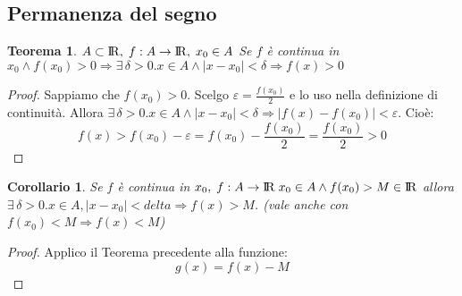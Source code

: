 \documentclass[12pt, a4paper]{article}
\theoremstyle{break}
\newtheorem{theorem}{Teorema}[subsection]
\newtheorem{corollary}{Corollario}[theorem]
\newcommand\R{{\rm I\!R}}
\begin{document}
    \subsection{Permanenza del segno}
    \begin{theorem}
        $A\subset\R,\; f:A\rightarrow\R ,\; x_0\in A$ Se $f$ è continua in $x_0 \wedge f(x_0)>0\Rightarrow\exists\,\delta >0. x\in A \wedge |x-x_0|<\delta\Rightarrow f(x)>0$
    \end{theorem}
    \begin{proof}
        Sappiamo che $f(x_0) > 0$. Scelgo $\varepsilon = \frac{f(x_0)}{2}$ e lo uso nella definizione di continuità.\newline
        Allora $\exists\,\delta>0. x\in A \wedge |x-x_0|<\delta \Rightarrow |f(x)-f(x_0)|<\varepsilon$. Cioè:\newline
        \[f(x)>f(x_0)-\varepsilon = f(x_0)-\frac{f(x_0)}{2} = \frac{f(x_0)}{2} > 0\]
    \end{proof}
    \begin{figure}[!htb]
        \centering
    \end{figure}
    \begin{corollary}
        Se $f$ è continua in $x_0,\; f:A\rightarrow\R\; x_0\in A \wedge f(x_0)>M\in\R$ allora $\exists\,\delta>0. x\in A, |x-x_0|<delta\Rightarrow f(x) > M$.\newline
        (vale anche con $f(x_0)<M\Rightarrow f(x)<M$) 
    \end{corollary}
    \begin{proof}
        Applico il Teorema precedente alla funzione:
        \[g(x) = f(x)-M\]
    \end{proof}
    \newpage
\end{document}
